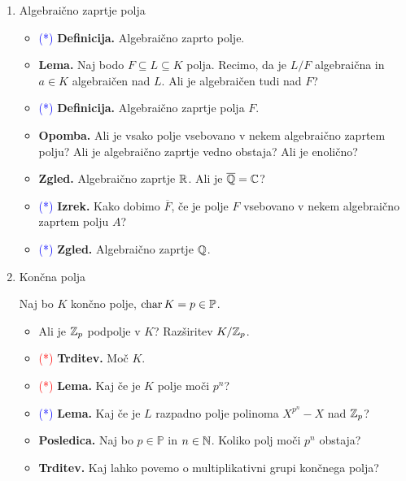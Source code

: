 \begin{enumerate}
    \newpage
    \item Algebraično zaprtje polja
    \begin{itemize}
        \item \textcolor{blue}{(*)} \textbf{Definicija.} Algebraično zaprto polje.
        \item \textbf{Lema.} Naj bodo \(F \subseteq L \subseteq K\) polja. Recimo, da je \(L/F\) algebraična in \(a \in K\) algebraičen nad \(L\). Ali je algebraičen tudi nad \(F\)?
        \item \textcolor{blue}{(*)} \textbf{Definicija.} Algebraično zaprtje polja \(F\).
        \item \textbf{Opomba.} Ali je vsako polje vsebovano v nekem algebraično zaprtem polju? Ali je algebraično zaprtje vedno obstaja? Ali je enolično?
        \item \textbf{Zgled.} Algebraično zaprtje \(\mathbb{R}\). Ali je \(\overline{\mathbb{Q}} = \mathbb{C}\)?
        \item \textcolor{blue}{(*)} \textbf{Izrek.} Kako dobimo \(\overline{F}\), če je polje \(F\) vsebovano v nekem algebraično zaprtem polju \(A\)?
        \item \textcolor{blue}{(*)} \textbf{Zgled.} Algebraično zaprtje \(\mathbb{Q}\).
    \end{itemize}

    \item Končna polja
    
    Naj bo \(K\) končno polje, \(\operatorname{char} K = p \in \mathbb{P}\).
    \begin{itemize}
        \item Ali je \(\mathbb{Z}_p\) podpolje v \(K\)? Razširitev \(K/\mathbb{Z}_p\).
        \item \textcolor{red}{(*)} \textbf{Trditev.} Moč \(K\).
        \item \textcolor{red}{(*)} \textbf{Lema.} Kaj če je \(K\) polje moči \(p^n\)?
        \item \textcolor{blue}{(*)} \textbf{Lema.}  Kaj če je \(L\) razpadno polje polinoma \(X^{p^n}-X\) nad \(\mathbb{Z}_p\)?
        \item \textbf{Posledica.} Naj bo \(p \in \mathbb{P}\) in \(n \in \mathbb{N}\). Koliko polj moči \(p^n\) obstaja?
        \item \textbf{Trditev.} Kaj lahko povemo o multiplikativni grupi končnega polja?
    \end{itemize}


\end{enumerate}
